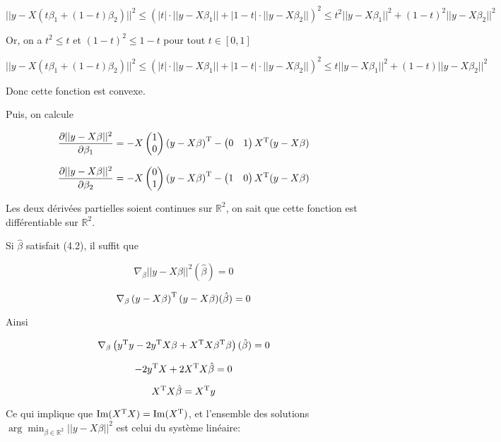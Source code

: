 \documentclass[a4paper,12pt]{article}
\begin{document}
$$||y - X(t\beta_1 + (1-t)\beta_2)||^2 \le (|t| \cdot ||y - X\beta_1|| + |1-t| \cdot ||y - X\beta_2||)^2 \le t^2||y - X\beta_1||^2 + (1-t)^2||y - X\beta_2||^2$$

Or, on a $t^2 \le t$ et $(1-t)^2 \le 1-t$ pour tout $t \in [0, 1]$

$$||y - X(t\beta_1 + (1-t)\beta_2)||^2 \le (|t| \cdot ||y - X\beta_1|| + |1-t| \cdot ||y - X\beta_2||)^2 \le t||y - X\beta_1||^2 + (1-t)||y - X\beta_2||^2$$

Donc cette fonction est convexe.

Puis, on calcule

$$\frac{\partial ||y - X\beta||^2}{\partial \beta_1} = -X 
\begin{pmatrix}
	1 \\
	0
\end{pmatrix}
\left(y - X\beta\right)^{\text T} - 
\begin{pmatrix}
	0 & 1
\end{pmatrix}
X^{\text T}(y - X\beta)$$

$$\frac{\partial ||y - X\beta||^2}{\partial \beta_2} = -X 
\begin{pmatrix}
	0 \\
	1
\end{pmatrix}
\left(y - X\beta\right)^{\text T} - 
\begin{pmatrix}
	1 & 0
\end{pmatrix}
X^{\text T}(y - X\beta)$$

Les deux dérivées partielles soient continues sur $\mathbb{R}^2$, on sait que cette fonction est différentiable sur $\mathbb{R}^2$.

Si $\hat\beta$ satisfait (4.2), il suffit que

$$ \nabla_{\beta} ||y - X\beta||^2 (\hat\beta) = 0 $$

$$ \nabla_{\beta} \left(y - X\beta\right)^{\text T} (y - X\beta) (\hat\beta) = 0 $$

Ainsi

$$ \nabla_{\beta} \left(y^{\text T}y - 2y^{\text T} X\beta + X^{\text T}X\beta^{\text T}\beta\right) (\hat\beta) = 0 $$

$$ - 2y^{\text T}X  + 2X{^\text T}X\hat\beta = 0 $$

$$ X{^\text T}X\hat\beta = X^{\text T}y $$

Ce qui implique que ${\rm Im} (X ^ {\text T}X) = {\rm Im} (X ^ {\text T})$, et l'ensemble des solutions $\arg \min_{\beta\in\mathbb{R}^2}||y - X\beta||^2$ est celui du système linéaire:
\end{document}

